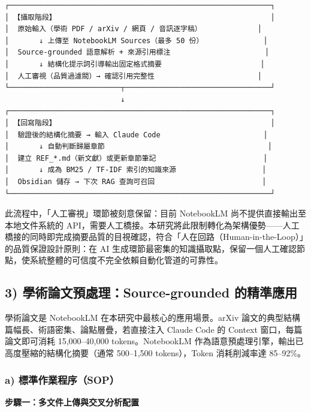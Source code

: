 \begin{verbatim}
┌─────────────────────────────────────────────────────────────┐
│ 【攝取階段】                                                  │
│  原始輸入（學術 PDF / arXiv / 網頁 / 音訊逐字稿）             │
│       ↓ 上傳至 NotebookLM Sources（最多 50 份）              │
│  Source-grounded 語意解析 + 來源引用標注                      │
│       ↓ 結構化提示詞引導輸出固定格式摘要                       │
│  人工審視（品質過濾閥）→ 確認引用完整性                        │
└──────────────────────────┬──────────────────────────────────┘
                           ↓
┌─────────────────────────────────────────────────────────────┐
│ 【回寫階段】                                                  │
│  驗證後的結構化摘要 → 輸入 Claude Code                        │
│       ↓ 自動判斷歸屬章節                                      │
│  建立 REF_*.md（新文獻）或更新章節筆記                         │
│       ↓ 成為 BM25 / TF-IDF 索引的知識來源                    │
│  Obsidian 儲存 → 下次 RAG 查詢可召回                         │
└─────────────────────────────────────────────────────────────┘
\end{verbatim}

此流程中，「人工審視」環節被刻意保留：目前 NotebookLM
尚不提供直接輸出至本地文件系統的
API，需要人工橋接。本研究將此限制轉化為架構優勢------人工橋接的同時即完成摘要品質的目視確認，符合「人在回路（Human-in-the-Loop）」的品質保證設計原則：在
AI
生成環節最密集的知識攝取點，保留一個人工確認節點，使系統整體的可信度不完全依賴自動化管道的可靠性。

\subsection{3) 學術論文預處理：Source-grounded
的精準應用}\label{ux5b78ux8853ux8ad6ux6587ux9810ux8655ux7406source-grounded-ux7684ux7cbeux6e96ux61c9ux7528}

學術論文是 NotebookLM 在本研究中最核心的應用場景。arXiv
論文的典型結構篇幅長、術語密集、論點層疊，若直接注入 Claude Code 的
Context 窗口，每篇論文即可消耗 15,000--40,000 tokens。NotebookLM
作為語意預處理引擎，輸出已高度壓縮的結構化摘要（通常 500--1,500
tokens），Token 消耗削減率達 85--92\%。

\subsubsection{a)
標準作業程序（SOP）}\label{a-ux6a19ux6e96ux4f5cux696dux7a0bux5e8fsop}

\textbf{步驟一：多文件上傳與交叉分析配置}

